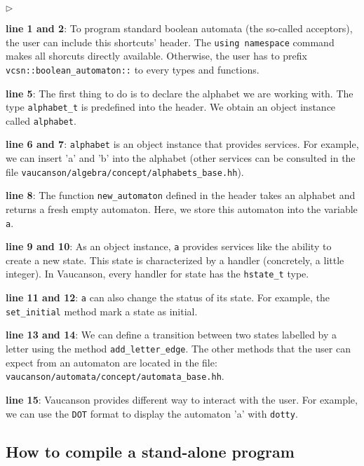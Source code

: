 \documentclass{article}
\begin{document}
\begin{list}{$\triangleright$}{}
\item \textbf{line 1 and 2}: To program standard boolean automata (the
  so-called acceptors), the user can include this shortcuts' header.
  The \verb!using namespace! command makes all shorcuts directly
  available. Otherwise, the user has to prefix
  \verb!vcsn::boolean_automaton::! to every types and functions.
\item \textbf{line 5}: The first thing to do is to declare the
alphabet we are working with. The type \verb!alphabet_t! is predefined
into the header. We obtain an object instance called \verb!alphabet!.
\item \textbf{line 6 and 7}: \verb!alphabet! is an object instance
that provides services. For example, we can insert 'a' and 'b' into
the alphabet (other services can be consulted in the file
\verb!vaucanson/algebra/concept/alphabets_base.hh!).
\item \textbf{line 8}: The function \verb!new_automaton! defined in
the header takes an alphabet and returns a fresh empty automaton. Here,
we store this automaton into the variable \verb!a!.
\item \textbf{line 9 and 10}: As an object instance, \verb!a! provides
services like the ability to create a new state. This state is
characterized by a handler (concretely, a little integer). In Vaucanson,
every handler for state has the \verb!hstate_t! type.
\item \textbf{line 11 and 12}: \verb!a! can also change the status of
its state. For example, the \verb!set_initial! method mark a state as
initial.
\item \textbf{line 13 and 14}: We can define a transition between two
states labelled by a letter using the method \verb!add_letter_edge!.
The other methods that the user can expect from an automaton are located in
the file: \verb!vaucanson/automata/concept/automata_base.hh!.
\item \textbf{line 15}: Vaucanson provides different way to interact
with the user. For example, we can use the \verb!DOT! format to
display the automaton 'a' with \verb!dotty!.
\end{list}

\subsection{How to compile a stand-alone program}
\end{document}
